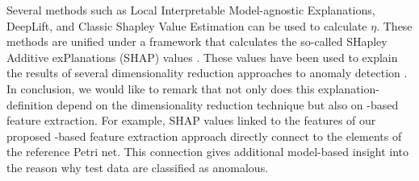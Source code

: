 Several methods such as Local Interpretable Model-agnostic Explanations, DeepLift, and Classic Shapley Value Estimation can be used to calculate $\eta$. These methods are unified under a framework that calculates the so-called SHapley Additive exPlanations (SHAP) values \cite{lundberg2017unifiedapproach}. These values have been used to explain the results of several dimensionality reduction approaches to anomaly detection \cite{takeishi2019pcashapexplanation,antwarg2021aeshapexplanation}. In conclusion, we would like to remark that not only does this explanation-definition depend on the dimensionality reduction technique but also on -based feature extraction. For example, SHAP values linked to the features of our proposed -based feature extraction approach directly connect to the elements of the reference Petri net. This connection gives additional model-based insight into the reason why test data are classified as anomalous.

